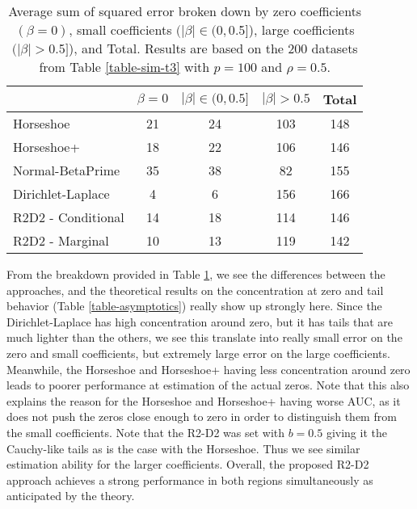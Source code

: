 \documentclass[12pt]{article}
\begin{document}
\begin{table}[htbp]
	\centering
	\renewcommand{\arraystretch}{1.2}
	\begin{tabular}{|l|c|c|c|c|}
		\hline
		& $\beta = 0 $ & $|\beta| \in(0,0.5]$ & $|\beta| > 0.5$ & Total \\
		\hline
		Horseshoe & 21 & 24 & 103 & 148\\
		\hline
		Horseshoe+& 18 & 22 & 106 & 146 \\
		\hline
		Normal-BetaPrime & 35 & 38 & 82 & 155 \\
		\hline
		Dirichlet-Laplace & 4 & 6 & 156 & 166 \\
		\hline
		R2D2 - Conditional & 14 & 18 & 114 & 146 \\
		\hline
		R2D2 - Marginal & 10 & 13 & 119 & 142 \\
		\hline
	\end{tabular}
	\caption{\normalsize Average sum of squared error broken down by zero coefficients $(\beta = 0 )$, small coefficients $(|\beta| \in(0,$0$.$5$]$), large coefficients $(|\beta| > $0$.$5$]$), and Total. Results are based on the 200 datasets from Table \ref{table-sim-t3} with $p = 100$ and $\rho = 0.5$.}
	\label{table-breakdown}
\end{table}



From the breakdown provided in Table  \ref{table-breakdown}, we see the differences between the approaches, and the theoretical results on the concentration at zero and tail behavior (Table \ref{table-asymptotics}) really show up strongly here. Since the Dirichlet-Laplace has high concentration around zero, but it has tails that are much lighter than the others, we see this translate into really small error on the zero and small coefficients, but extremely large error on the large coefficients. Meanwhile, the Horseshoe and Horseshoe+ having less concentration around zero leads to poorer performance at estimation of the actual zeros. Note that this also explains the reason for the Horseshoe and Horseshoe+ having worse AUC, as it does not push the zeros close enough to zero in order to distinguish them from the small coefficients. Note that the R2-D2 was set with $b = 0.5$ giving it the Cauchy-like tails as is the case with the Horseshoe. Thus we see similar estimation ability for the larger coefficients. Overall, the proposed R2-D2 approach achieves a strong performance in both regions simultaneously as anticipated by the theory.
\end{document}
